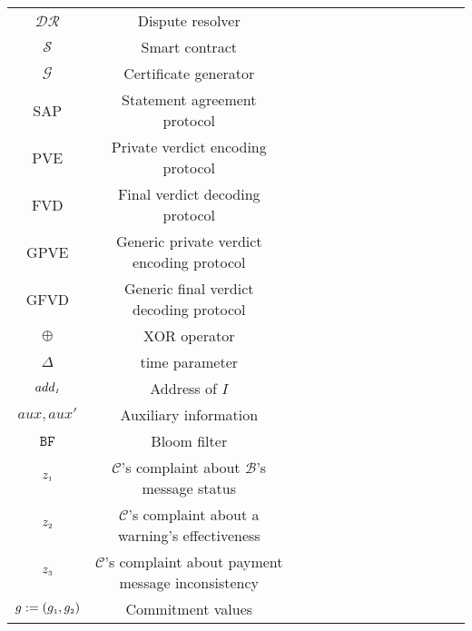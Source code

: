 \begin{table*}[!htbp]
\begin{scriptsize}
\begin{center}
{{\begin{tabular}{|c|c|c|c|c|c|c|c|c|c|c|c|c|c|}
%
\cellcolor{white!20}\scriptsize$\mathcal{DR}$ &\cellcolor{white!20}\scriptsize Dispute resolver  \\  
%
\cellcolor{gray!20}\scriptsize$\mathcal{S}$ &\cellcolor{gray!20}\scriptsize Smart contract  \\  
%
\cellcolor{white!20}\scriptsize$\mathcal{G}$ &\cellcolor{white!20}\scriptsize Certificate generator  \\  
%
\cellcolor{gray!20}\scriptsize{SAP} &\cellcolor{gray!20}\scriptsize  Statement agreement protocol\\ 
%
\cellcolor{white!20}\scriptsize{PVE} &\cellcolor{white!20}\scriptsize  Private verdict encoding protocol\\ 
%
\cellcolor{gray!20}\scriptsize{FVD} &\cellcolor{gray!20}\scriptsize  Final verdict decoding protocol\\ 
%
\cellcolor{white!20}\scriptsize{GPVE} &\cellcolor{white!20}\scriptsize  Generic private verdict encoding protocol\\ 
%
\cellcolor{gray!20}\scriptsize{GFVD} &\cellcolor{gray!20}\scriptsize  Generic final verdict decoding protocol\\ 
%
\cellcolor{white!20}\scriptsize$\oplus$ &\cellcolor{white!20}\scriptsize  XOR operator \\ 
%
\cellcolor{gray!20}\scriptsize$\Delta$ &\cellcolor{gray!20}\scriptsize  time parameter \\ 
%
\cellcolor{white!20}\scriptsize$add_{\scriptscriptstyle I}$ &\cellcolor{white!20}\scriptsize  Address of $I$\\ 
%
\cellcolor{gray!20}\scriptsize$aux, aux'$ &\cellcolor{gray!20}\scriptsize  Auxiliary information\\ 
%
\cellcolor{white!20}\scriptsize$\mathtt{BF}$ &\cellcolor{white!20}\scriptsize  Bloom filter\\ 
%
\cellcolor{gray!20}\scriptsize$z_{\scriptscriptstyle 1}$ &\cellcolor{gray!20}\scriptsize  $\mathcal{C}$'s complaint about $\mathcal{B}$'s message status\\ 
%
\cellcolor{white!20}\scriptsize$z_{\scriptscriptstyle 2}$ &\cellcolor{white!20}\scriptsize  $\mathcal{C}$'s complaint about a warning's effectiveness\\
% 
\cellcolor{gray!20}\scriptsize$z_{\scriptscriptstyle 3}$ &\cellcolor{gray!20}\scriptsize  $\mathcal{C}$'s complaint about payment message  inconsistency\\ 
%
\cellcolor{white!20}\scriptsize $g:=(g_{\scriptscriptstyle 1}, g_{\scriptscriptstyle 2})$&\cellcolor{white!20}\scriptsize  Commitment values \\    
%




\end{tabular}}}
\end{center}
\end{scriptsize}
\end{table*}
